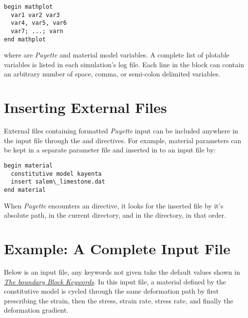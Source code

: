 \documentclass[letterpaper,10pt,english]{sphinxmanual}
\begin{document}
\begin{Verbatim}[commandchars=\\\{\}]
begin mathplot
  var1 var2 var3
  var4, var5, var6
  var7; ...; varn
end mathplot
\end{Verbatim}

where  are \emph{Payette} and material model variables. A complete list of
plotable variables is listed in each simulation's log file. Each line in the
 block can contain an arbitrary number of space, comma, or semi-colon
delimited variables.


\section{Inserting External Files}
\label{Files/input_file_formatting:inserting-files}\label{Files/input_file_formatting:inserting-external-files}
External files containing formatted \emph{Payette} input can be included anywhere in
the input file through the  and  directives. For
example, material parameters can be kept in a separate parameter file and
inserted in to an input file by:

\begin{Verbatim}[commandchars=\\\{\}]
begin material
  constitutive model kayenta
  insert salem\_limestone.dat
end material
\end{Verbatim}

When \emph{Payette} encounters an  directive, it looks for the
inserted file by it's absolute path, in the current directory, and in the
 directory, in that order.
\label{Files/input_file_formatting:examples}

\section{Example: A Complete Input File}
\label{Files/input_file_formatting:complete-input-file}\label{Files/input_file_formatting:example-a-complete-input-file}\label{Files/input_file_formatting:examples}
Below is an input file, any keywords not given take the default values shown in
{\hyperref[Files/input_file_formatting:legs-keywords]{\emph{The boundary Block Keywords}}}. In this input file, a material defined by the 
constitutive model is cycled through the same deformation path by first
prescribing the strain, then the stress, strain rate, stress rate, and finally
the deformation gradient.
\end{document}
